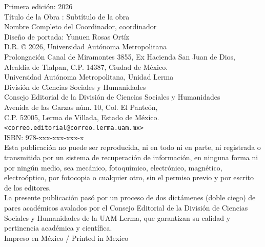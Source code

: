\begingroup
\begin{singlespace}
\scriptsize
\noindent
Primera edición: 2026\\
Título de la Obra : Subtítulo de la obra\\
Nombre Completo del Coordinador, coordinador\\[0.5em]
Diseño de portada: Yunuen Rosas Ortíz\\[0.5em]
D.R. © 2026, Universidad Autónoma Metropolitana\\
Prolongación Canal de Miramontes 3855, Ex Hacienda San Juan de Dios,\\
Alcaldía de Tlalpan, C.P. 14387, Ciudad de México.\\[0.5em]
{\scriptsize Universidad Autónoma Metropolitana, Unidad Lerma}\\
División de Ciencias Sociales y Humanidades\\
Consejo Editorial de la División de Ciencias Sociales y Humanidades\\
Avenida de las Garzas núm. 10, Col. El Panteón,\\
C.P. 52005, Lerma de Villada, Estado de México.\\
\texttt{<correo.editorial@correo.lerma.uam.mx>}\\[0.8em]
ISBN: 978-xxx-xxx-xxx-x\\[0.8em]
Esta publicación no puede ser reproducida, ni en todo ni en parte, ni registrada o transmitida por un sistema de recuperación de información, en ninguna forma ni por ningún medio, sea mecánico, fotoquímico, electrónico, magnético, electroóptico, por fotocopia o cualquier otro, sin el permiso previo y por escrito de los editores.\\[0.5em]
La presente publicación pasó por un proceso de dos dictámenes (doble ciego) de pares académicos avalados por el Consejo Editorial de la División de Ciencias Sociales y Humanidades de la UAM-Lerma, que garantizan su calidad y pertinencia académica y científica.\\[0.5em]
Impreso en México / Printed in Mexico
\end{singlespace}
\endgroup
\clearpage

\clearpage
\thispagestyle{empty}
\null
\clearpage